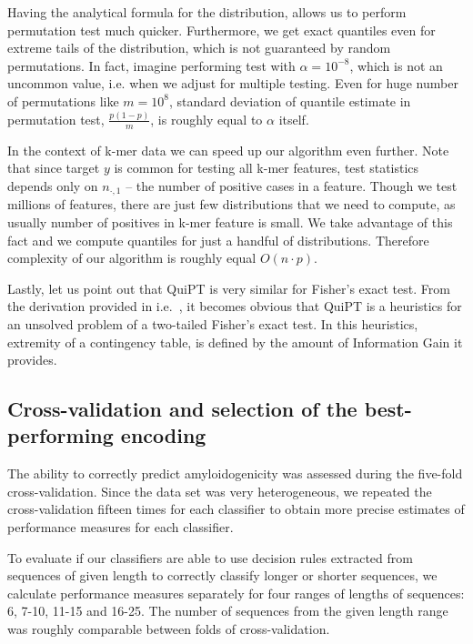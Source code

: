 \documentclass{bioinfo}
\begin{document}
\begin{methods}
 Having the analytical formula for the distribution, allows us to perform permutation test much quicker. 
Furthermore, we get exact quantiles even for extreme tails of the distribution,
which is not guaranteed by random permutations. 
In fact, imagine performing test with $\alpha=10^{-8}$, which is
not an uncommon value, i.e. when we adjust for multiple testing.
Even for huge number of permutations like $m=10^8$, standard deviation of quantile estimate 
in permutation test, $\frac{p(1-p)}{m}$, is roughly equal to $\alpha$ itself.

 In the context of k-mer data we can speed up our algorithm even further. Note that
since target $y$ is common for testing all k-mer features, test statistics depends only on
$n_{\cdot, 1}$ -- the number of positive cases in a feature. 
Though we test millions of features, there are just few distributions
that we need to compute, as usually number of positives in k-mer feature is small. 
We take advantage of this fact and we compute quantiles for just a handful of distributions.
Therefore complexity of our algorithm is roughly equal $O(n\cdot p)$.

Lastly, let us point out that QuiPT is very similar for Fisher's exact test.
From the derivation provided in i.e.~\citep{lehmann2008testing}, it becomes obvious that
QuiPT is a heuristics for an unsolved problem of a two-tailed Fisher's exact test.
In this heuristics, extremity of a contingency table, is defined by the amount of 
Information Gain it provides.

\subsection{Cross-validation and selection of the best-performing encoding}

The ability to correctly predict amyloidogenicity was assessed during the 
five-fold cross-validation. Since the data set was very heterogeneous, we 
repeated the cross-validation fifteen times for each classifier to obtain more 
precise estimates of performance measures for each classifier. 

  To evaluate if our classifiers are able to use decision rules extracted from 
sequences of given length to correctly classify longer or shorter sequences, we 
calculate performance measures separately for four ranges of lengths of 
sequences: 6, 7-10, 11-15 and 16-25. The number of sequences from the given 
length range was roughly comparable between folds of cross-validation.
  

\end{methods}
\end{document}
